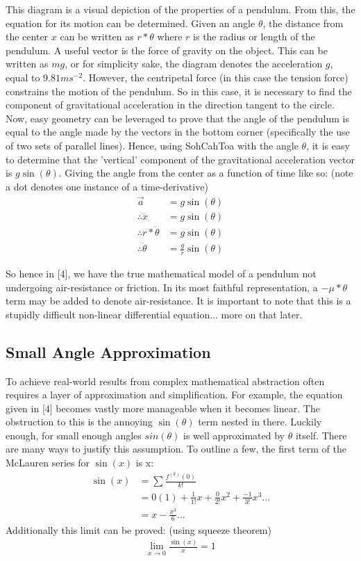 \documentclass[11pt,a4paper]{article}
\begin{document}
This diagram is a visual depiction of the properties of a pendulum.  From this, the equation for its motion can be determined.  Given an angle $\theta$,  the distance from the center $x$ can be written as $r*\theta$ where $r$ is the radius or length of the pendulum.  A useful vector is the force of gravity on the object.  This can be written as $mg$,  or for simplicity sake,  the diagram denotes the acceleration $g$, equal to $9.81 ms^{-2}$.  However,  the centripetal force (in this case the tension force) constrains the motion of the pendulum.  So in this case,  it is necessary to find the component of gravitational acceleration in the direction tangent to the circle.  Now,  easy geometry can be leveraged to prove that the angle of the pendulum is equal to the angle made by the vectors in the bottom corner (specifically the use of two sets of parallel lines).  Hence,  using SohCahToa with the angle $\theta$,  it is easy to determine that the 'vertical' component of the gravitational acceleration vector is $g \sin(\theta)$.  Giving the angle from the center as a function of time like so: (note a dot denotes one instance of a time-derivative)
\begin{align}
\overrightarrow{a} &= g\sin(\theta) \\
\therefore \ddot{x} &= g\sin(\theta) \\
\therefore r*\ddot{\theta} &= g\sin(\theta) \\
\therefore \ddot{\theta} &= \frac{g}{r}\sin(\theta)
\end{align}

So hence in [4],  we have the true mathematical model of a pendulum not undergoing air-resistance or friction.  In its most faithful representation,  a $-\mu * \theta$ term may be added to denote air-resistance.  It is important to note that this is a stupidly difficult non-linear differential equation...  more on that later.
\subsection{Small Angle Approximation}
To achieve real-world results from complex mathematical abstraction often requires a layer of approximation and simplification.  For example,  the equation given in [4] becomes vastly more manageable when it becomes linear.  The obstruction to this is the annoying $\sin(\theta)$ term nested in there.  Luckily enough,  for small enough angles $sin(\theta)$ is well approximated by $\theta$ itself.  There are many ways to justify this assumption.  To outline a few,  the first term of the McLauren series for $\sin(x)$ is x:
\begin{align*}
\sin(x) &= \sum\frac{f^{(k)}(0)}{k!} \\
&= 0(1) + \frac{1}{1!}x+\frac{0}{2!}x^2 + \frac{-1}{3!}x^3... \\
&= x - \frac{x^3}{6}...
\end{align*}
Additionally this limit can be proved: (using squeeze theorem)
\begin{align*}
\lim_{x\rightarrow 0} \frac{\sin(x)}{x}=1
\end{align*}
\end{document}
